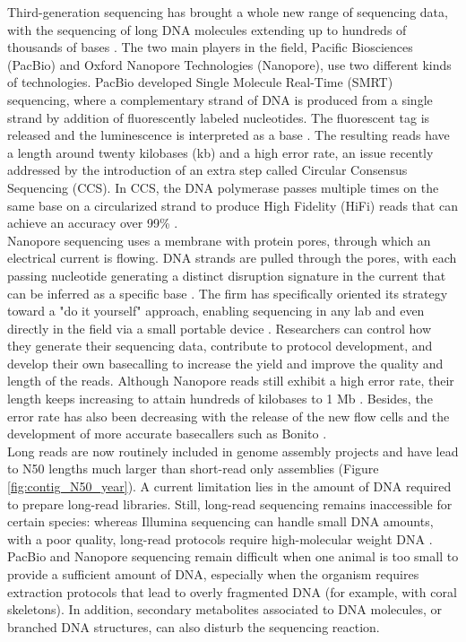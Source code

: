 Third-generation sequencing has brought a whole new range of sequencing data, with the sequencing of long DNA molecules extending up to hundreds of thousands of bases \cite{pollard2018}. The two main players in the field, Pacific Biosciences (PacBio) and Oxford Nanopore Technologies (Nanopore), use two different kinds of technologies. PacBio developed Single Molecule Real-Time (SMRT) sequencing, where a complementary strand of DNA is produced from a single strand by addition of fluorescently labeled nucleotides. The fluorescent tag is released and the luminescence is interpreted as a base \cite{pacbio_smrt}. The resulting reads have a length around twenty kilobases (kb) and a high error rate, an issue recently addressed by the introduction of an extra step called Circular Consensus Sequencing (CCS). In CCS, the DNA polymerase passes multiple times on the same base on a circularized strand to produce High Fidelity (HiFi) reads that can achieve an accuracy over 99\% \cite{pacbio_ccs}. \\

Nanopore sequencing uses a membrane with protein pores, through which an electrical current is flowing. DNA strands are pulled through the pores, with each passing nucleotide generating a distinct disruption signature in the current that can be inferred as a specific base \cite{nanopore}. The firm has specifically oriented its strategy toward a "do it yourself" approach, enabling sequencing in any lab and even directly in the field via a small portable device \cite{minion}. Researchers can control how they generate their sequencing data, contribute to protocol development, and develop their own basecalling \cite{basecallers} to increase the yield and improve the quality and length of the reads. Although Nanopore reads still exhibit a high error rate, their length keeps increasing to attain hundreds of kilobases to 1 Mb \cite{Jain2018}. Besides, the error rate has also been decreasing with the release of the new flow cells and the development of more accurate basecallers such as Bonito \cite{bonito}. \\

Long reads are now routinely included in genome assembly projects and have lead to N50 lengths much larger than short-read only assemblies (Figure \ref{fig:contig_N50_year}). A current limitation lies in the amount of DNA required to prepare long-read libraries. Still, long-read sequencing remains inaccessible for certain species: whereas Illumina sequencing can handle small DNA amounts, with a poor quality, long-read protocols require high-molecular weight DNA \cite{dna-extraction}. PacBio and Nanopore sequencing remain difficult when one animal is too small to provide a sufficient amount of DNA, especially when the organism requires extraction protocols that lead to overly fragmented DNA (for example, with coral skeletons). In addition, secondary metabolites associated to DNA molecules, or branched DNA structures, can also disturb the sequencing reaction. \\


